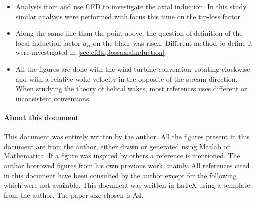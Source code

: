 \documentclass[a4paper,11pt]{book}
\begin{document}
\begin{itemize}
    \item Analysis from \cite{hansen:2004} and \cite{johansen:2004} use CFD to investigate the axial induction. In this study similar analysis were performed with focus this time on the tip-loss factor.
    \item Along the same line than the point above, the question of definition of the local induction factor $a_B$ on the blade was risen. Different method to define it were investigated in \autoref{sec:cfdtiplossaxialinduction}
    \item All the figures are done with the wind turbine convention, rotating clockwise and with a relative wake velocity in the opposite of the stream direction. When studying the theory of helical wakes, most references uses different or inconsistent conventions.
\end{itemize}


\paragraph{About this document} This document was entirely written by the author. All the figures present in this document are from the author, either drawn or generated using Matlab or Mathematica. If a figure was inspired by others a reference is mentioned. The author borrowed figures from his own previous work, mainly\cite{branlard:2011}. 
All references cited in this document have been consulted by the author except for the following which were not available\cite{rasmussen:1988}\cite{madsen:1988}\cite{ronsten:1991}\cite{bruining:1993}\cite{rankine:1865}\cite{himmelskamp:1945}\cite{savino:1985}\cite{corrigan:1994}. This document was written in \LaTeX{} using a template from the author. The paper size chosen is A4.

\nocite{branlard:gusts}
\nocite{komninos:2008}
\end{document}

